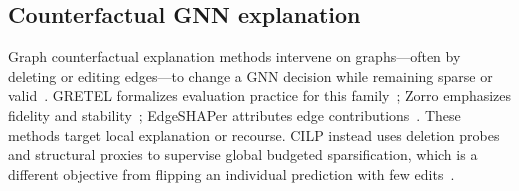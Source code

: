 \subsection{Counterfactual GNN explanation}
Graph counterfactual explanation methods intervene on graphs---often by deleting or editing edges---to change a GNN decision while remaining sparse or valid~\citep{lucic2022cfgnn,pradoromero2022gretel,funke2022zorro,mastropietro2022edgeshaper}.
GRETEL formalizes evaluation practice for this family~\citep{pradoromero2022gretel}; Zorro emphasizes fidelity and stability~\citep{funke2022zorro}; EdgeSHAPer attributes edge contributions~\citep{mastropietro2022edgeshaper}.
These methods target local explanation or recourse.
CILP instead uses deletion probes and structural proxies to supervise global budgeted sparsification, which is a different objective from flipping an individual prediction with few edits~\citep{agarwal2023evaluating}.
